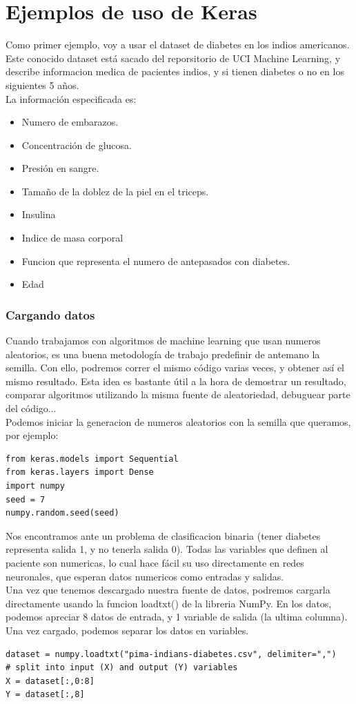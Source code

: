 \chapter{Ejemplos de uso de Keras}
Como primer ejemplo, voy a usar el dataset de diabetes en los indios americanos. Este conocido dataset está sacado del reporsitorio de UCI Machine Learning, y describe informacion medica de pacientes indios, y si tienen diabetes o no en los siguientes 5 años.\\		
La información especificada es:
\begin{itemize}[noitemsep]
\item Numero de embarazos.		
\item Concentración de glucosa.		
\item Presión en sangre.		
\item Tamaño de la doblez de la piel en el triceps.		
\item Insulina		
\item Indice de masa corporal		
\item Funcion que representa el numero de antepasados con diabetes.		
\item Edad		
\end{itemize}
\subsection{Cargando datos}

Cuando trabajamos con algoritmos de machine learning que usan numeros aleatorios, es una buena metodología de trabajo predefinir de antemano la semilla. Con ello, podremos correr el mismo código varias veces, y obtener así el mismo resultado. Esta idea es bastante útil a la hora de demostrar un resultado, comparar algoritmos utilizando la misma fuente de aleatoriedad, debuguear parte del código...\\
Podemos iniciar la generacion de numeros aleatorios con la semilla que queramos, por ejemplo:
\begin{verbatim}
from keras.models import Sequential
from keras.layers import Dense
import numpy
seed = 7
numpy.random.seed(seed)
\end{verbatim}
Nos encontramos ante un problema de clasificacion binaria (tener diabetes representa salida 1, y no tenerla salida 0). Todas las variables que definen al paciente son numericas, lo cual hace fácil su uso directamente en redes neuronales, que esperan datos numericos como entradas y salidas.\\
Una vez que tenemos descargado nuestra fuente de datos, podremos cargarla directamente usando la funcion loadtxt() de la libreria NumPy. En los datos, podemos apreciar 8 datos de entrada, y 1 variable de salida (la ultima columna). Una vez cargado, podemos separar los datos en variables.
\begin{verbatim}
dataset = numpy.loadtxt("pima-indians-diabetes.csv", delimiter=",")
# split into input (X) and output (Y) variables
X = dataset[:,0:8]
Y = dataset[:,8]
\end{verbatim}

